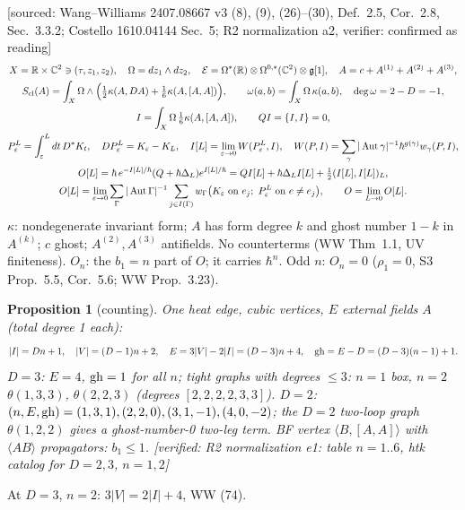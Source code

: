 \documentclass[10pt,a4paper]{article}
\numberwithin{equation}{section}
\newtheorem{proposition}[theorem]{Proposition}
\theoremstyle{definition}
\theoremstyle{remark}
\newcommand{\g}{\mathfrak g}
\newcommand{\Aut}{\operatorname{Aut}}
\newcommand{\ver}[1]{\textup{[verified: #1]}}
\newcommand{\src}[1]{\textup{[sourced: #1]}}
\begin{document}
\src{Wang--Williams 2407.08667 v3 (8), (9), (26)--(30), Def.~2.5, Cor.~2.8, Sec.~3.3.2; Costello 1610.04144 Sec.~5; R2 normalization a2, verifier: confirmed as reading}
\begin{gather}
X=\mathbb R\times\mathbb C^2\ni(\tau,z_1,z_2),\quad \Omega=dz_1\wedge dz_2,\quad \mathcal E=\Omega^*(\mathbb R)\otimes\Omega^{0,*}(\mathbb C^2)\otimes\g[1],\quad A=c+A^{(1)}+A^{(2)}+A^{(3)},\\
S_{\rm cl}(A)=\int_X\Omega\wedge\Big(\tfrac12\kappa(A,DA)+\tfrac16\kappa(A,[A,A])\Big),\qquad \omega(a,b)=\int_X\Omega\,\kappa(a,b),\quad \deg\omega=2-D=-1,\\
I=\int_X\Omega\,\tfrac16\kappa(A,[A,A]),\qquad QI=\{I,I\}=0,\\
P_\varepsilon^L=\int_\varepsilon^Ldt\,D^*K_t,\quad DP_\varepsilon^L=K_\varepsilon-K_L,\quad I[L]=\lim_{\varepsilon\to0}W(P_\varepsilon^L,I),\quad W(P,I)=\sum_\gamma|\Aut\gamma|^{-1}\hbar^{g(\gamma)}w_\gamma(P,I),\\
O[L]=\hbar\,e^{-I[L]/\hbar}(Q+\hbar\Delta_L)e^{I[L]/\hbar}=QI[L]+\hbar\Delta_LI[L]+\tfrac12(I[L],I[L])_L,\\
O[L]=\lim_{\varepsilon\to0}\sum_\Gamma|\Aut\Gamma|^{-1}\sum_{j\in I(\Gamma)}w_\Gamma\big(K_\varepsilon\text{ on }e_j;\ P^L_\varepsilon\text{ on }e\neq e_j\big),\qquad O=\lim_{L\to0}O[L].
\end{gather}
$\kappa$: nondegenerate invariant form; $A$ has form degree $k$ and ghost number $1-k$ in $A^{(k)}$; $c$ ghost; $A^{(2)},A^{(3)}$ antifields. No counterterms (WW Thm~1.1, UV finiteness). $O_n$: the $b_1=n$ part of $O$; it carries $\hbar^n$. Odd $n$: $O_n=0$ ($\rho_1=0$, S3 Prop.~5.5, Cor.~5.6; WW Prop.~3.23).

\begin{proposition}[counting]\label{prop-count}
One heat edge, cubic vertices, $E$ external fields $A$ (total degree 1 each):
\begin{equation}
|I|=Dn+1,\quad |V|=(D-1)n+2,\quad E=3|V|-2|I|=(D-3)n+4,\quad {\rm gh}=E-D=(D-3)(n-1)+1 .
\end{equation}
$D=3$: $E=4$, ${\rm gh}=1$ for all $n$; tight graphs with degrees $\le3$: $n=1$ box, $n=2$ $\theta(1,3,3)$, $\theta(2,2,3)$ (degrees $[2,2,2,2,3,3]$). $D=2$: $(n,E,{\rm gh})=(1,3,1),(2,2,0),(3,1,-1),(4,0,-2)$; the $D=2$ two-loop graph $\theta(1,2,2)$ gives a ghost-number-0 two-leg term. BF vertex $\langle B,[A,A]\rangle$ with $\langle AB\rangle$ propagators: $b_1\le1$.
\ver{R2 normalization e1: table $n=1..6$, htk catalog for $D=2,3$, $n=1,2$}
\end{proposition}
At $D=3$, $n=2$: $3|V|=2|I|+4$, WW (74).
\end{document}
